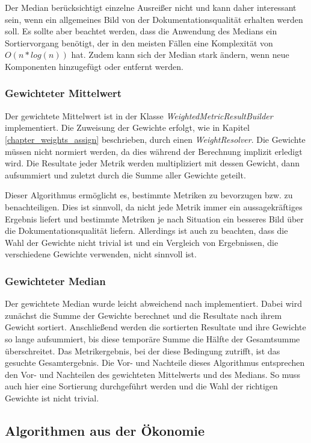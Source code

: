 Der Median berücksichtigt einzelne Ausreißer nicht und kann daher interessant sein, wenn ein allgemeines Bild von der Dokumentationsqualität erhalten werden soll. Es sollte aber beachtet werden, dass die Anwendung des Medians ein Sortiervorgang benötigt, der in den meisten Fällen eine Komplexität von $O(n*log(n))$ hat.  Zudem kann sich der Median stark ändern, wenn neue Komponenten hinzugefügt oder entfernt werden.


\subsubsection{Gewichteter Mittelwert}\label{chapter:weighted_aggreg}
Der gewichtete Mittelwert ist in der Klasse \textit{WeightedMetricResultBuilder} implementiert. Die Zuweisung der Gewichte erfolgt, wie in Kapitel \ref{chapter_weights_assign} beschrieben, durch einen \textit{WeightResolver}. Die Gewichte müssen nicht normiert werden, da dies während der Berechnung implizit erledigt wird. Die Resultate jeder Metrik werden multipliziert mit dessen Gewicht, dann aufsummiert und zuletzt durch die Summe aller Gewichte geteilt. 


Dieser Algorithmus ermöglicht es, bestimmte Metriken zu bevorzugen bzw. zu benachteiligen. Dies ist sinnvoll, da nicht jede Metrik immer ein aussagekräftiges Ergebnis liefert und bestimmte Metriken je nach Situation ein besseres Bild über die Dokumentationsqualität liefern. Allerdings ist auch zu beachten, dass die Wahl der Gewichte nicht trivial ist und ein Vergleich von Ergebnissen, die verschiedene Gewichte verwenden, nicht sinnvoll ist.

\subsubsection{Gewichteter Median}
Der gewichtete Median wurde leicht abweichend nach \cite[S. 37]{YAGER199835} implementiert. Dabei wird zunächst die Summe der Gewichte berechnet und die Resultate nach ihrem Gewicht sortiert. Anschließend werden die sortierten Resultate und ihre Gewichte so lange aufsummiert, bis diese temporäre Summe die Hälfte der Gesamtsumme überschreitet. Das Metrikergebnis, bei der diese Bedingung zutrifft, ist das gesuchte Gesamtergebnis. Die Vor- und Nachteile dieses Algorithmus entsprechen den Vor- und Nachteilen des gewichteten Mittelwerts und des Medians. So muss auch hier eine Sortierung durchgeführt werden und die Wahl der richtigen Gewichte ist nicht trivial. 

 \subsection{Algorithmen aus der Ökonomie}
 
